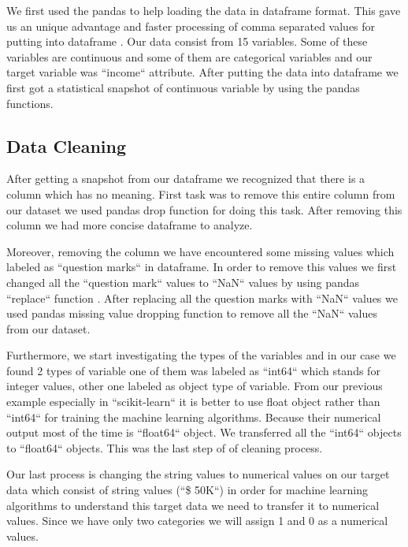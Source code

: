 \documentclass[sigconf]{acmart}
\begin{document}
We first used the pandas \cite{www-pandas} to help loading the data in dataframe format. This gave us an unique advantage and faster processing of comma separated values for putting into dataframe \cite{www-commasep}.  Our data consist from 15 variables. Some of these variables are continuous and some of them are categorical variables and our target variable was ``income`` attribute. After putting the data into dataframe we first got a statistical snapshot of continuous variable by using the pandas \cite{www-pandas.describe} functions. 

\subsection{Data Cleaning}

After getting a snapshot from our dataframe we recognized that there is a column which has no meaning. First task was to remove this entire column from our dataset we used pandas drop function for doing this task. After removing this column we had more concise dataframe to analyze. 

\par Moreover, removing the column we have encountered some missing values which labeled as ``question marks`` in dataframe. In order to remove this values we first changed all the ``question mark`` values to ``NaN`` values by using pandas ``replace`` function \cite{www-pandas.replace}. After replacing all the question marks with ``NaN`` values we used pandas missing value dropping function to remove all the ``NaN`` values from our dataset. 

\par Furthermore, we start investigating the types of the variables and  in our case we found 2 types of variable one of them was labeled as ``int64`` which stands for integer values, other one labeled as object type of variable. From our previous example especially in ``scikit-learn`` it is better to use float object rather than ``int64`` for training the machine learning algorithms. Because their numerical output most of the time is ``float64`` object. We transferred all the ``int64`` objects to ``float64`` objects. This was the last step of of cleaning process. 

\par Our last process is changing the string values to numerical values on our target data which consist of string values (``\$ 50K``) in order for machine learning algorithms to understand this target data we need to transfer it to numerical values. Since we have only two categories we will assign 1 and 0 as a numerical values. 
\end{document}
